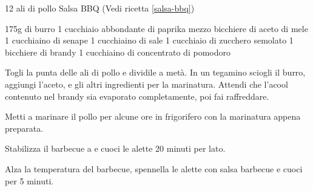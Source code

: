 \begin{ingreds}
	12 ali di pollo 
	Salsa BBQ (Vedi ricetta \ref{salsa-bbq})

\columnbreak
{}
	175g di burro
	1 cucchiaio abbondante di paprika 
	mezzo bicchiere di aceto di mele 
	1 cucchiaino di senape 
	1 cucchiaino di sale
	1 cucchiaio di zucchero semolato
	1 bicchiere di brandy 
	1 cucchiaino di concentrato di pomodoro 
\end{ingreds}

\begin{method}
Togli la punta delle ali di pollo e dividile a metà. In un tegamino sciogli il burro, aggiungi l'aceto, e gli altri ingredienti per la marinatura. Attendi che l'acool contenuto nel brandy sia evaporato completamente, poi fai raffreddare.

Metti a marinare il pollo per alcune ore in frigorifero con la marinatura appena preparata.

Stabilizza il barbecue a  e cuoci le alette 20 minuti per lato.

Alza la temperatura del barbecue, spennella le alette con salsa barbecue e cuoci per 5 minuti.
\end {method}
